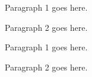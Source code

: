 \documentclass{book}
\begin{document}
\begingroup
\beginnumbering
\numberpstarttrue

\autopar

Paragraph 1 goes here.

Paragraph 2 goes here.

\endnumbering
\endgroup

\begingroup
\beginnumbering
\numberpstarttrue

\pstart
Paragraph 1 goes here.
\pend

\pstart
Paragraph 2 goes here.
\pend

\endnumbering
\endgroup
\end{document}
